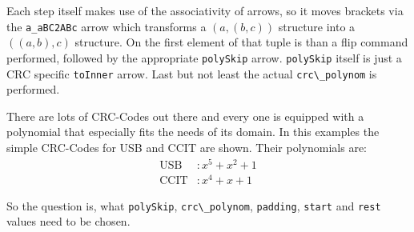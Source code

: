 \documentclass[9pt,final,a4paper,leqno]{article}
\newcommand{\hs}[1]{\mbox{\lstinline[basicstyle=\color{textgray}]!#1!}}
\begin{document}
\par
Each step itself makes use of the associativity of arrows, so it moves brackets via the \hs{a_aBC2ABc} arrow which transforms a \((a, (b,
c))\) structure into a \(((a, b), c)\) structure. On the first element of that tuple is than a flip command performed, followed by the
appropriate \hs{polySkip} arrow. \hs{polySkip} itself is just a CRC specific \hs{toInner} arrow. Last but not least the actual
\hs{crc\_polynom} is performed.


\par 
There are lots of CRC-Codes out there and every one is equipped with a polynomial that especially fits the needs of its domain. In this
examples the simple CRC-Codes for USB and CCIT are shown. Their polynomials are:
\begin{align*}
  \text{USB} &: x^5 + x^2 + 1 \\
  \text{CCIT}&: x^4 + x   + 1 
\end{align*}

So the question is, what \hs{polySkip}, \hs{crc\_polynom}, \hs{padding}, \hs{start} and \hs{rest} values need to be chosen.
\end{document}
